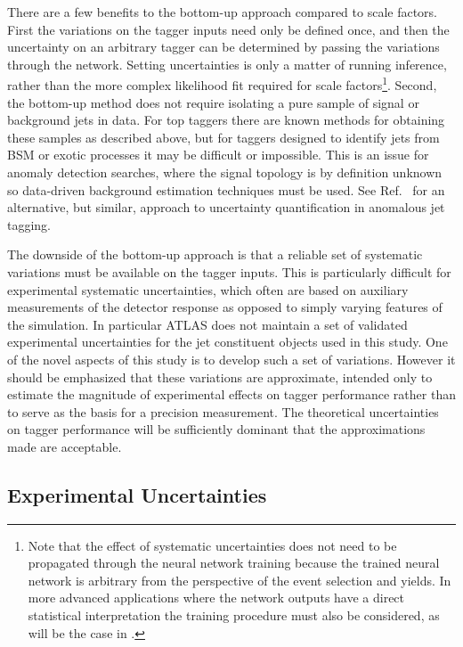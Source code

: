 There are a few benefits to the bottom-up approach compared to scale factors.
First the variations on the tagger inputs need only be defined once, and then the uncertainty on an arbitrary tagger can be determined by passing the variations through the network.
Setting uncertainties is only a matter of running inference, rather than the more complex likelihood fit required for scale factors\footnote{Note that the effect of systematic uncertainties does not need to be propagated through the neural network training because the trained neural network is arbitrary from the perspective of the event selection and yields. In more advanced applications where the network outputs have a direct statistical interpretation the training procedure must also be considered, as will be the case in .}.
Second, the bottom-up method does not require isolating a pure sample of signal or background jets in data.
For top taggers there are known methods for obtaining these samples as described above, but for taggers designed to identify jets from BSM or exotic processes it may be difficult or impossible.
This is an issue for anomaly detection searches, where the signal topology is by definition unknown~\cite{ATLAS:2025obc, CMS:2025sch} so data-driven background estimation techniques must be used.
See Ref.~\cite{CMS:2025eyd} for an alternative, but similar, approach to uncertainty quantification in anomalous jet tagging.

The downside of the bottom-up approach is that a reliable set of systematic variations must be available on the tagger inputs.
This is particularly difficult for experimental systematic uncertainties, which often are based on auxiliary measurements of the detector response as opposed to simply varying features of the simulation.
In particular ATLAS does not maintain a set of validated experimental uncertainties for the jet constituent objects used in this study.
One of the novel aspects of this study is to develop such a set of variations.
However it should be emphasized that these variations are approximate, intended only to estimate the magnitude of experimental effects on tagger performance rather than to serve as the basis for a precision measurement.
The theoretical uncertainties on tagger performance will be sufficiently dominant that the approximations made are acceptable.

\subsection{Experimental Uncertainties}

